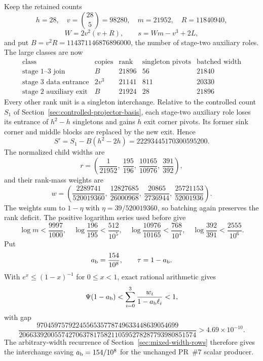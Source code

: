 Keep the retained counts
\[
 h=28,\quad v=\binom{28}{5}=98280,\quad m=21952,\quad R=11840940,
\]
\[
 W=2v^2(v+R),\qquad s=Wm-v^3+2L,
\]
and put $B=v^2R=114371146876896000$, the number of stage-two auxiliary
roles. The large classes are now
\[
\begin{array}{c|r|r|r|r}
 \text{class}&\text{copies}&\text{rank}&\text{singleton pivots}&
   \text{batched width}\\\hline
 \text{stage 1--3 join}&B&21896&56&21840\\
 \text{stage 3 data entrance}&2v^3&21141&811&20330\\
 \text{stage 2 auxiliary exit}&B&21924&28&21896
\end{array}
\]
Every other rank unit is a singleton interchange. Relative to the
controlled count $S_1$ of Section~\ref{sec:controlled-projector-basis},
each stage-two auxiliary role loses its entrance of $h^2-h$ singletons and
gains $h$ exit corner pivots. Its former sink corner and middle blocks are
replaced by the new exit. Hence
\[
 S'=S_1-B(h^2-2h)=22293445170300595200.
\]
The normalized child widths are
\[
 r=\left(\frac1{21952},\ \frac{195}{196},\ \frac{10165}{10976},\
       \frac{391}{392}\right),
\]
and their rank-mass weights are
\[
 w=\left(\frac{2289741}{520019360},\ \frac{12827685}{26000968},\
       \frac{20865}{2736944},\ \frac{25721153}{52001936}\right).
\]
The weights sum to $1-\eta$ with $\eta=39/520019360$, so batching again
preserves the rank deficit. The positive logarithm series used before give
\[
 \log m<\frac{9997}{1000},\quad
 \log\frac{196}{195}<\frac{512}{10^5},\quad
 \log\frac{10976}{10165}<\frac{768}{10^4},\quad
 \log\frac{392}{391}<\frac{2555}{10^6}.
\]
Put
\[
 a_{\rm b}=\frac{154}{10^8},\qquad \tau=1-a_{\rm b}.
\]
With $e^x\le(1-x)^{-1}$ for $0\le x<1$, exact rational arithmetic gives
\[
 \Psi(1-a_{\rm b})<\sum_{i=0}^3\frac{w_i}{1-a_{\rm b}\ell_i}<1,
\]
with gap
\[
 \frac{9704597579224556535778749633448639054699}
      {20663392005574270637817582110595278287793980851574}
 >4.69\times10^{-10}.
\]
The arbitrary-width recurrence of Section~\ref{sec:mixed-width-rows}
therefore gives the interchange saving $a_{\rm b}=154/10^8$ for the
unchanged PR~\#7 scalar producer.
